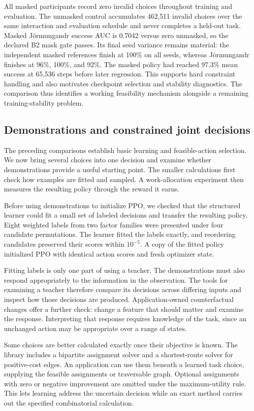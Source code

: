 \documentclass{strategynet-journal}
\newcommand{\JORM}{\textsf{Jörmungandr}}
\begin{document}
All masked participants record zero invalid choices throughout training and
evaluation.  The unmasked control accumulates 462,511 invalid choices over the
same interaction and evaluation schedule and never completes a held-out task.
Masked \JORM{} success AUC is 0.7042 versus zero unmasked, so the declared B2
mask gate passes.  Its final seed variance remains material: the independent
masked references finish at 100\% on all seeds, whereas \JORM{} finishes at
96\%, 100\%, and 92\%.  The masked policy had reached 97.3\% mean success at
65,536 steps before later regression.  This supports hard constraint handling
and also motivates checkpoint selection and stability diagnostics.
The comparison thus identifies a working feasibility mechanism alongside a
remaining training-stability problem.

\subsection{Demonstrations and constrained joint decisions}

The preceding comparisons establish basic learning and feasible-action
selection. We now bring several choices into one decision and examine whether
demonstrations provide a useful starting point. The smaller calculations first
check how examples are fitted and sampled. A work-allocation experiment then
measures the resulting policy through the reward it earns.

Before using demonstrations to initialize PPO, we checked that the structured
learner could fit a small set of labeled decisions and transfer the resulting
policy. Eight weighted labels from two factor families were presented under
four candidate permutations. The learner fitted the labels exactly, and
reordering candidates preserved their scores within $10^{-5}$.
A copy of the fitted policy initialized PPO with identical action scores and
fresh optimizer state.

Fitting labels is only one part of using a teacher. The demonstrations must
also respond appropriately to the information in the observation. The tools
for examining a teacher therefore compare its decisions across differing
inputs and inspect how those decisions are produced. Application-owned
counterfactual changes offer a further check: change a feature that should
matter and examine the response. Interpreting that response requires knowledge
of the task, since an unchanged action may be appropriate over a range of
states.

Some choices are better calculated exactly once their objective is known.
The library includes a bipartite assignment solver and a shortest-route
solver for positive-cost edges. An application can use them beneath a learned
task choice, supplying the feasible assignments or traversable graph. Optional
assignments with zero or negative improvement are omitted under the
maximum-utility rule. This lets learning address the uncertain decision while
an exact method carries out the specified combinatorial calculation.
\end{document}
